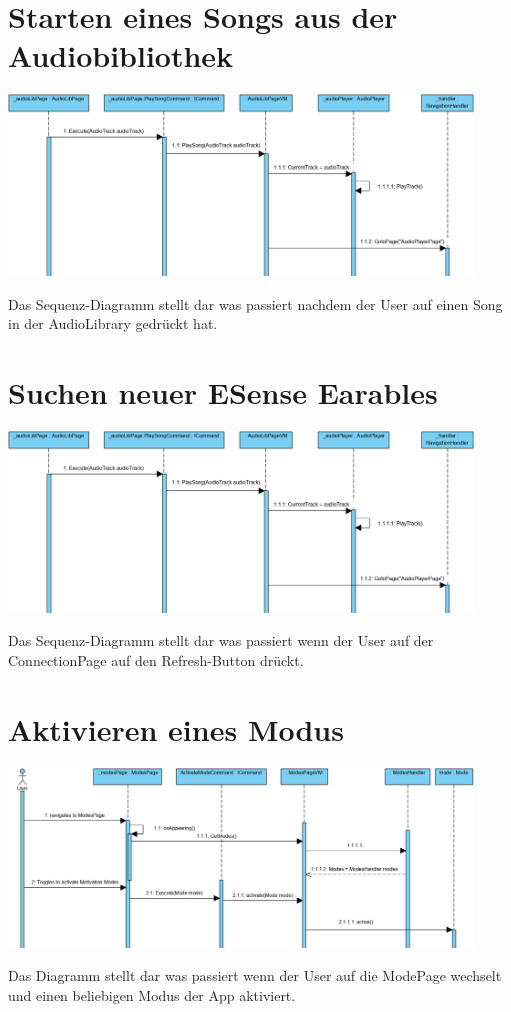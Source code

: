 \documentclass[../entwurf.tex]{subfiles}
\begin{document}
\section{Starten eines Songs aus der Audiobibliothek}
\begin{center}
	\includegraphics[page=1,width=350pt,keepaspectratio]{../graphics/sequenz_diagramme/PlaySongSequenzDia.png}
\end{center}
Das Sequenz-Diagramm stellt dar was passiert nachdem der User auf einen Song in der AudioLibrary gedrückt hat.
\section{Suchen neuer ESense Earables}
\begin{center}
	\includegraphics[page=1,width=350pt,keepaspectratio]{../graphics/sequenz_diagramme/PlaySongSequenzDia.png}
\end{center}
Das Sequenz-Diagramm stellt dar was passiert wenn der User auf der ConnectionPage auf den Refresh-Button drückt.
\section{Aktivieren eines Modus}
\begin{center}
	\includegraphics[page=1,width=350pt,keepaspectratio]{../graphics/sequenz_diagramme/ActivateModeDia.png}
\end{center}
Das Diagramm stellt dar was passiert wenn der User auf die ModePage wechselt und einen beliebigen Modus der App aktiviert.
\end{document}
